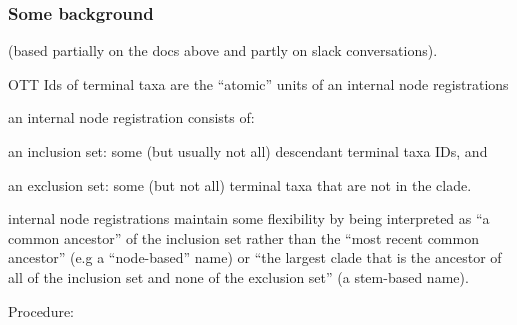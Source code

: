 \documentclass[11pt]{article}
\begin{document}
\subsubsection{Some background}
(based partially on the docs above and partly on slack conversations).
\begin{compactenum}
  \item OTT Ids of terminal taxa are the ``atomic'' units of an internal node registrations
  \item an internal node registration consists of:
  \begin{compactitem}
    \item an inclusion set: some (but usually not all) descendant terminal taxa IDs, and
    \item an exclusion set: some (but not all) terminal taxa that are not in the clade.
  \end{compactitem}
  \item internal node registrations maintain some flexibility by being interpreted as ``a 
  common ancestor'' of the inclusion set rather than the ``most recent common 
  ancestor'' (e.g a ``node-based'' name) or ``the largest clade that is the 
  ancestor of all of the inclusion set and none of the exclusion set'' (a stem-based name).
\end{compactenum}
Procedure:
\end{document}
